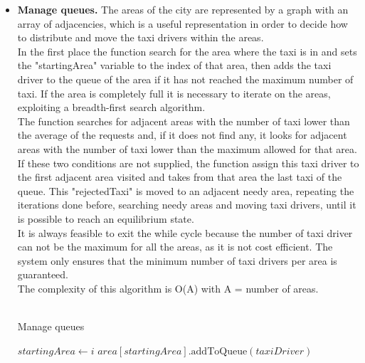 \begin{itemize}
			\newpage
			\item \textbf{Manage queues.} The areas of the city are represented by a graph with an array of adjacencies, which is a useful representation in order to decide how to distribute and move the taxi drivers within the areas.\\
			In the first place the function search for the area where the taxi is in and sets the "startingArea" variable to the index of that area, then adds the taxi driver to the queue of the area if it has not reached the maximum number of taxi. If the area is completely full it is necessary to iterate on the areas, exploiting a breadth-first search algorithm.\\The function searches for adjacent areas with the number of taxi lower than the average of the requests and, if it does not find any, it looks for adjacent areas with the number of taxi lower than the maximum allowed for that area.\\ If these two conditions are not supplied, the function assign this taxi driver to the first adjacent area visited and takes from that area the last taxi of the queue. This "rejectedTaxi" is moved to an adjacent needy area, repeating the iterations done before, searching needy areas and moving taxi drivers, until it is possible to reach an equilibrium state.\\
			It is always feasible to exit the while cycle because the number of taxi driver can not be the maximum for all the areas, as it is not cost efficient. The system only ensures that the minimum number of taxi drivers per area is guaranteed.\\
			The complexity of this algorithm is O(A) with A = number of areas.
			\\\\
			
			
			\begin{algorithm}
				\caption{Manage queues}
				\begin{algorithmic}[1]
							\State $ startingArea \gets i $
						\EndIf
					\EndFor
						\State $ area[startingArea].\text{addToQueue}(taxiDriver)$
					

\end{algorithmic}
\end{algorithm}
\end{itemize}
